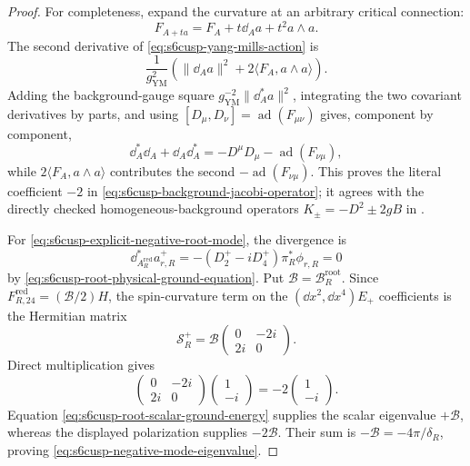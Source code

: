\begin{proof}
For completeness, expand the curvature at an arbitrary critical connection:
\[
 F_{A+ta}=F_A+t\dd_Aa+t^2a\wedge a.
\]
The second derivative of \eqref{eq:s6cusp-yang-mills-action} is
\[
 \frac1{g_{\mathrm{YM}}^2}
 \left(\lVert\dd_Aa\rVert^2
 +2\langle F_A,a\wedge a\rangle\right).
\]
Adding the background-gauge square
\(g_{\mathrm{YM}}^{-2}\lVert\dd_A^*a\rVert^2\), integrating the two
covariant derivatives by parts, and using
\([D_\mu,D_\nu]=\operatorname{ad}(F_{\mu\nu})\) gives, component by
component,
\[
 \dd_A^*\dd_A+\dd_A\dd_A^*
 =-D^\mu D_\mu-\operatorname{ad}(F_{\nu\mu}),
\]
while \(2\langle F_A,a\wedge a\rangle\) contributes the second
\(-\operatorname{ad}(F_{\nu\mu})\).  This proves the literal coefficient
\(-2\) in \eqref{eq:s6cusp-background-jacobi-operator}; it agrees with the
directly checked homogeneous-background operators
\(K_\pm=-D^2\pm2gB\) in \cite[eqs.~(1)--(2)]{Oxman2010}.

For \eqref{eq:s6cusp-explicit-negative-root-mode}, the divergence is
\[
 \dd_{A_R^{\mathrm{red}}}^*a_{r,R}^+
 =-(D_2^+-iD_4^+)\pi_R^*\phi_{r,R}=0
\]
by \eqref{eq:s6cusp-root-physical-ground-equation}.  Put
\(\mathcal B=\mathcal B_R^{\mathrm{root}}\).  Since
\(F^{\mathrm{red}}_{R,24}=(\mathcal B/2)H\), the spin-curvature term on
the \((\dd x^2,\dd x^4)E_+\) coefficients is the Hermitian matrix
\begin{equation}\label{eq:s6cusp-root-spin-matrix}
 \mathcal S_R^+
 =\mathcal B
 \begin{pmatrix}0&-2i\\2i&0\end{pmatrix}.
\end{equation}
Direct multiplication gives
\[
 \begin{pmatrix}0&-2i\\2i&0\end{pmatrix}
 \begin{pmatrix}1\\-i\end{pmatrix}
 =-2\begin{pmatrix}1\\-i\end{pmatrix}.
\]
Equation \eqref{eq:s6cusp-root-scalar-ground-energy} supplies the scalar
eigenvalue \(+\mathcal B\), whereas the displayed polarization supplies
\(-2\mathcal B\).  Their sum is
\(-\mathcal B=-4\pi/\delta_R\), proving
\eqref{eq:s6cusp-negative-mode-eigenvalue}.


\end{proof}
